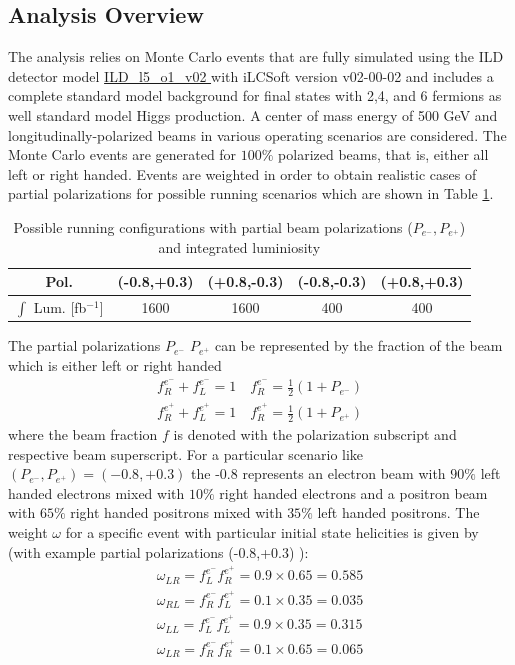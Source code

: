 \subsection{Analysis Overview}
\label{subsec:ana_overview}
The analysis relies on Monte Carlo events that are fully simulated using the ILD detector model \url{ ILD_l5_o1_v02 } with iLCSoft version v02-00-02 and includes a complete standard model background for final states with 2,4, and 6 fermions as well standard model Higgs production.  A center of mass energy of 500 GeV and longitudinally-polarized beams in various operating scenarios are considered. The Monte Carlo events are generated for $100\%$ polarized beams, that is, either all left or right handed. Events are weighted in order to obtain realistic cases of partial polarizations for possible running scenarios which are shown in Table \ref{tab:beamscenario}.

\begin{table}

\caption{Possible running configurations with partial beam polarizations ($P_{e^-},P_{e^+}$) and integrated luminiosity \cite{ilcop} }
\label{tab:beamscenario}
\begin{tabular}{|c|c|c|c|c|}
\hline 
Pol. &(-0.8,+0.3) & (+0.8,-0.3) & (-0.8,-0.3) & (+0.8,+0.3) \\ 
\hline 
$\int$ Lum. [fb$^{-1}$] & 1600 & 1600 & 400 & 400 \\ 
\hline 
\end{tabular} 

\end{table}
 The partial polarizations $P_{e^-} \, \, P_{e^+}$  can be represented by the fraction of the beam which is either left or right handed
 \begin{equation}
 \begin{split}
f_R^{e^-} + f_L^{e^-} = 1 \, \, \, \, \, \, f_R^{e^-} = \frac{1}{2}(1 + P_{e^-}) \\
f_R^{e^+} + f_L^{e^+} = 1 \, \, \, \, \, \, f_R^{e^+} = \frac{1}{2}(1 + P_{e^+})
\end{split}
 \end{equation}
where the beam fraction $f$ is denoted with the polarization subscript and respective beam superscript. For a particular scenario like $(P_{e^-}, P_{e^+}) = (-0.8, +0.3)$ the -0.8 represents an electron beam with $90\% $ left handed electrons mixed with $10\% $ right handed electrons and a positron beam with $65\%$ right handed positrons mixed with $35\%$ left handed positrons. The weight $\omega$ for a specific event with particular initial state helicities is given by (with example partial polarizations (-0.8,+0.3) ):
 \begin{equation}
 \begin{split} 
 \omega_{LR} = f_L^{e^-}f_R^{e^+} = 0.9 \times 0.65 = 0.585 \\
 \omega_{RL} = f_R^{e^-}f_L^{e^+} = 0.1 \times 0.35 = 0.035 \\
 \omega_{LL} = f_L^{e^-}f_L^{e^+} = 0.9 \times 0.35 = 0.315 \\
 \omega_{LR} = f_R^{e^-}f_R^{e^+} = 0.1 \times 0.65 = 0.065 
 \end{split}
 \end{equation} 

